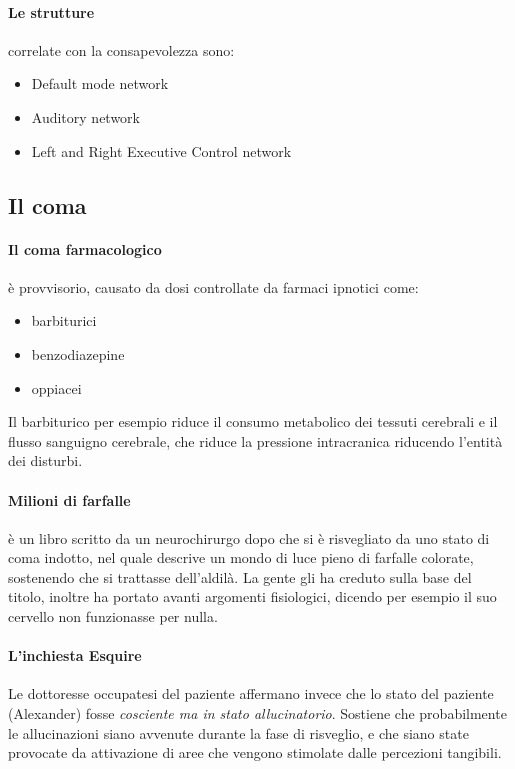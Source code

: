 \documentclass[12pt, a4paper]{article}
\begin{document}
\paragraph{Le strutture} correlate con la consapevolezza sono:

\begin{itemize}
    \item Default mode network
    \item Auditory network
    \item Left and Right Executive Control network
\end{itemize}

\subsection{Il coma}

\paragraph{Il coma farmacologico} \`e provvisorio, causato da dosi controllate da farmaci ipnotici come:

\begin{itemize}
    \item barbiturici
    \item benzodiazepine
    \item oppiacei
\end{itemize}

Il barbiturico per esempio riduce il consumo metabolico dei tessuti cerebrali e il flusso sanguigno cerebrale, che riduce la pressione intracranica riducendo l'entit\`a dei disturbi.

\paragraph{Milioni di farfalle} \`e un libro scritto da un neurochirurgo dopo che si \`e risvegliato da uno stato di coma indotto, nel quale descrive un mondo di luce pieno di farfalle colorate, sostenendo che si trattasse dell'aldil\`a. La gente gli ha creduto sulla base del titolo, inoltre ha portato avanti argomenti fisiologici, dicendo per esempio il suo cervello non funzionasse per nulla.

\paragraph{L'inchiesta Esquire} Le dottoresse occupatesi del paziente affermano invece che lo stato del paziente (Alexander) fosse \emph{cosciente ma in stato allucinatorio}. Sostiene che probabilmente le allucinazioni siano avvenute durante la fase di risveglio, e che siano state provocate da attivazione di aree che vengono stimolate dalle percezioni tangibili.
\end{document}
